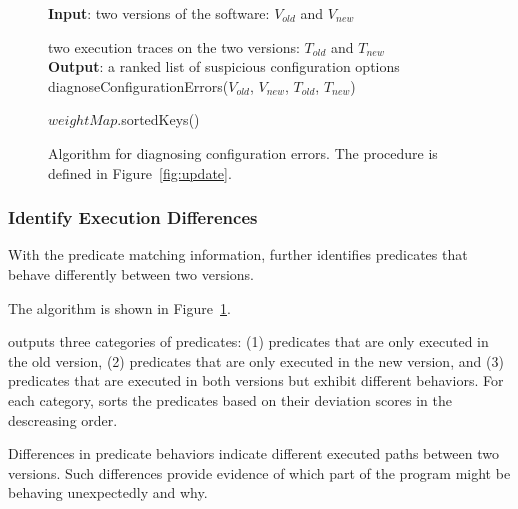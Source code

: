 

\begin{figure}[t]
\textbf{Input}: two versions of the software: $\mathit{V_{old}}$ and $V_{new}$

\quad two execution traces on the two versions: $\mathit{T_{old}}$ and $T_{new}$\\
\textbf{Output}: a ranked list of suspicious configuration options\\
\vspace{-4mm}%
diagnoseConfigurationErrors($\mathit{V_{old}}$, $\mathit{V_{new}}$, $\mathit{T_{old}}$, $\mathit{T_{new}}$)\\
\begin{algorithmic}[1]
\STATE 
\RETURN $\mathit{weightMap}$.sortedKeys()
\end{algorithmic}
\caption{Algorithm for diagnosing configuration errors. The
procedure  is defined in Figure~\ref{fig:update}.
\label{fig:identify}
}
\end{figure}


\subsubsection{Identify Execution Differences}
\label{sec:identify_diff}

With the predicate matching information, \ourtool further
identifies predicates that behave differently
between two versions. 

The algorithm is shown in Figure~\ref{fig:identify}. \ourtool
{}

\ourtool outputs three categories of predicates:
(1) predicates that are only executed in the
old version, (2) predicates that are only executed
in the new version, and (3) predicates that
are executed in both versions but exhibit different
behaviors. For each category, \ourtool sorts the
predicates based on their deviation scores in the
descreasing order.


Differences in predicate behaviors indicate different executed paths
between two versions. Such differences provide evidence of
which part of the program might be behaving unexpectedly and why.


